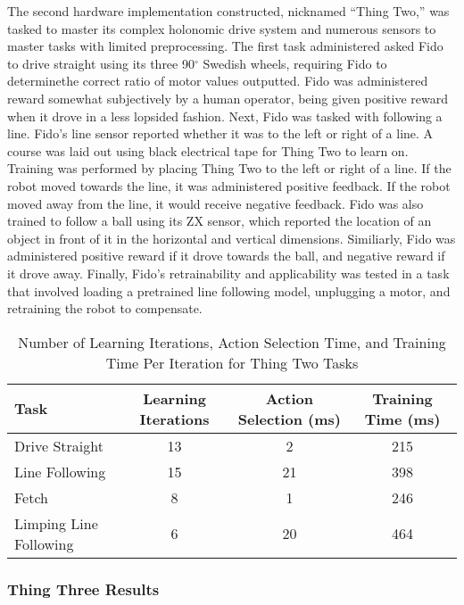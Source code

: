 The second hardware implementation constructed, nicknamed ``Thing Two,'' was tasked to master its complex holonomic drive system and numerous sensors to master tasks with limited preprocessing.
The first task administered asked Fido to drive straight using its three 90$^{\circ}$ Swedish wheels, requiring Fido to determinethe correct ratio of motor values outputted.
Fido was administered reward somewhat subjectively by a human operator, being given positive reward when it drove in a less lopsided fashion.
Next, Fido was tasked with following a line.
Fido's line sensor reported whether it was to the left or right of a line.
A course was laid out using black electrical tape for Thing Two to learn on.
Training was performed by placing Thing Two to the left or right of a line.
If the robot moved towards the line, it was administered positive feedback.
If the robot moved away from the line, it would receive negative feedback.
Fido was also trained to follow a ball using its ZX sensor, which reported the location of an object in front of it in the horizontal and vertical dimensions.
Similiarly, Fido was administered positive reward if it drove towards the ball, and negative reward if it drove away.
Finally, Fido's retrainability and applicability was tested in a task that involved loading a pretrained line following model, unplugging a motor, and retraining the robot to compensate.

\begin{table}[ht]
	\centering
	\begin{tabular}{@{}lccc@{}}
		\toprule
		Task              & Learning Iterations & Action Selection (ms) & Training Time (ms) \\ \midrule
		Drive Straight         & 13             & 2                     & 215                \\
		Line Following         & 15             & 21                    & 398                \\
		Fetch                  & 8              & 1                     & 246                \\
		Limping Line Following & 6              & 20                    & 464                \\ \bottomrule
	\end{tabular}
	\caption {Number of Learning Iterations, Action Selection Time, and Training Time Per Iteration for Thing Two Tasks} \label{tab:thingtworesults}
\end{table}

\subsubsection{Thing Three Results}

